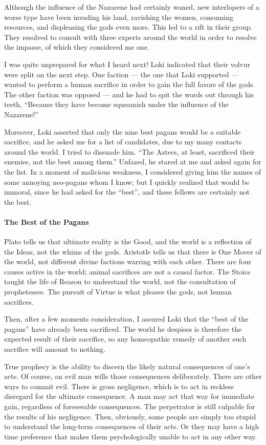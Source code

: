 Although the influence of the Nazarene had certainly waned, new interlopers of a worse type have been invading his land, ravishing the women, consuming resources, and displeasing the gods even more. This led to a rift in their group. They resolved to consult with three experts around the world in order to resolve the impasse, of which they considered me one.

I was quite unprepared for what I heard next! Loki indicated that their volvur were split on the next step. One faction --- the one that Loki supported --- wanted to perform a human sacrifice in order to gain the full favors of the gods. The other faction was opposed --- and he had to spit the words out through his teeth, ``Because they have become squeamish under the influence of the Nazarene!''

Moreover, Loki asserted that only the nine best pagans would be a suitable sacrifice, and he asked me for a list of candidates, due to my many contacts around the world. I tried to dissuade him. ``The Aztecs, at least, sacrificed their enemies, not the best among them.'' Unfazed, he stared at me and asked again for the list. In a moment of malicious weakness, I considered giving him the names of some annoying neo-pagans whom I know; but I quickly realized that would be immoral, since he had asked for the ``best'', and these fellows are certainly not the best.

\paragraph{The Best of the Pagans}


Plato tells us that ultimate reality is the Good, and the world is a reflection of the Ideas, not the whims of the gods. Aristotle tells us that there is One Mover of the world, not different divine factions warring with each other. There are four causes active in the world; animal sacrifices are not a causal factor. The Stoics taught the life of Reason to understand the world, not the consultation of prophetesses. The pursuit of Virtue is what pleases the gods, not human sacrifices.

Then, after a few moments consideration, I assured Loki that the ``best of the pagans'' have already been sacrificed. The world he despises is therefore the expected result of their sacrifice, so any homeopathic remedy of another such sacrifice will amount to nothing.

True prophecy is the ability to discern the likely natural consequences of one's acts. Of course, an evil man wills those consequences deliberately. There are other ways to commit evil. There is gross negligence, which is to act in reckless disregard for the ultimate consequence. A man may act that way for immediate gain, regardless of foreseeable consequences. The perpetrator is still culpable for the results of his negligence. Then, obviously, some people are simply too stupid to understand the long-term consequences of their acts. Or they may have a high time preference that makes them psychologically unable to act in any other way.

